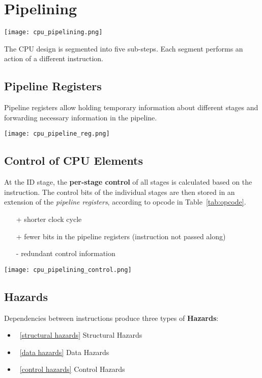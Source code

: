 \section{Pipelining}\label{pipelining}

    \texttt{[image: cpu\_pipelining.png]}

    The CPU design is segmented into five sub-steps. Each segment performs an action of a different instruction.

    \subsection{Pipeline Registers}
    Pipeline registers allow holding temporary information about different stages and forwarding necessary information in the pipeline.
    \begin{center}
        \texttt{[image: cpu\_pipeline\_reg.png]}
    \end{center}

    \subsection{Control of CPU Elements}
    At the ID stage, the \textbf{per-stage control} of all stages is calculated based on the instruction.
    The control bits of the individual stages are then stored in an extension of the \textit{pipeline registers}, according to opcode in Table~\ref{tab:opcode}.
    \begin{itemize}
        \item[+] shorter clock cycle
        \item[+] fewer bits in the pipeline registers (instruction not passed along)
        \item[-] redundant control information
    \end{itemize}

    \begin{center}
        \texttt{[image: cpu\_pipelining\_control.png]}
    \end{center}

    \subsection{Hazards}
    Dependencies between instructions produce three types of \textbf{Hazards}:
    \begin{itemize}
        \item~\ref{structural hazards} Structural Hazards
        \item~\ref{data hazards} Data Hazards
        \item~\ref{control hazards} Control Hazards
    \end{itemize}

